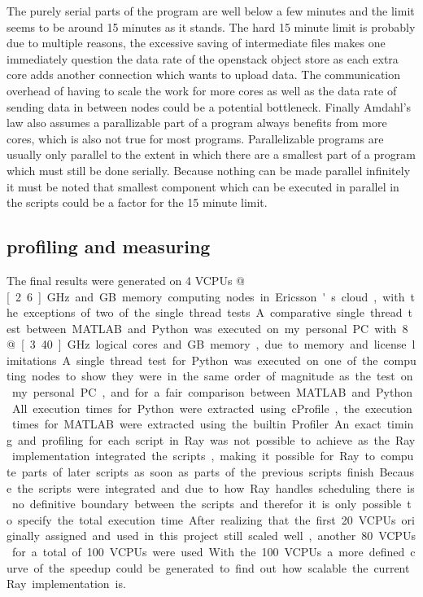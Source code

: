 \documentclass[12pt, a4paper]{article}
\begin{document}
The purely serial parts of the program are well below a few minutes and the limit seems to be around 15 minutes as it stands.
The hard 15 minute limit is probably due to multiple reasons, the excessive saving of intermediate files makes one immediately question the data rate of the openstack object store as each extra core adds another connection which wants to upload data. 
The communication overhead of having to scale the work for more cores as well as the data rate of sending data in between nodes could be a potential bottleneck.
Finally Amdahl's law also assumes a parallizable part of a program always benefits from more cores, which is also not true for most programs.
Parallelizable programs are usually only parallel to the extent in which there are a smallest part of a program which must still be done serially.
Because nothing can be made parallel infinitely it must be noted that smallest component which can be executed in parallel in the scripts could be a factor for the 15 minute limit.


\subsection{profiling and measuring}

The final results were generated on 4 VCPUs @ \unit[2.6]{GHz} and \unit[8]{GB} memory computing nodes in Ericsson's cloud, with the exceptions of two of the single thread tests.
A comparative single thread test between MATLAB and Python was executed on my personal PC with 8 @ \unit[3.40]{GHz} logical cores and \unit[36]{GB} memory, due to memory and license limitations. 
A single thread test for Python was executed on one of the computing nodes to show they were in the same order of magnitude as the test on my personal PC, and for a fair comparison between MATLAB and Python.

All execution times for Python were extracted using cProfile, the execution times for MATLAB were extracted using the builtin Profiler.
An exact timing and profiling for each script in Ray was not possible to achieve as the Ray implementation integrated the scripts, making it possible for Ray to compute parts of later scripts as soon as parts of the previous scripts finish.
Because the scripts were integrated and due to how Ray handles scheduling there is no definitive boundary between the scripts and therefor it is only possible to specify the total execution time.

After realizing that the first 20 VCPUs originally assigned and used in this project still scaled well, another 80 VCPUs for a total of 100 VCPUs were used. With the 100 VCPUs a more defined curve of the speedup could be generated to find out how scalable the current Ray implementation is.
\end{document}
